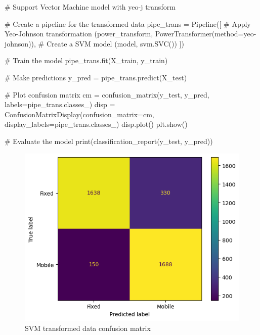 \documentclass[
  letterpaper,
  DIV=11,
  numbers=noendperiod,
  oneside]{scrartcl}
\newenvironment{Shaded}{\begin{snugshade}}{\end{snugshade}}
\newcommand{\BuiltInTok}[1]{\textcolor[rgb]{0.00,0.23,0.31}{#1}}
\newcommand{\CommentTok}[1]{\textcolor[rgb]{0.37,0.37,0.37}{#1}}
\newcommand{\NormalTok}[1]{\textcolor[rgb]{0.00,0.23,0.31}{#1}}
\newcommand{\OperatorTok}[1]{\textcolor[rgb]{0.37,0.37,0.37}{#1}}
\newcommand{\StringTok}[1]{\textcolor[rgb]{0.13,0.47,0.30}{#1}}
\begin{document}
\begin{Shaded}
\begin{Highlighting}[]
\CommentTok{\# Support Vector Machine model with yeo{-}j transform}

\CommentTok{\# Create a pipeline for the transformed data}
\NormalTok{pipe\_trans }\OperatorTok{=}\NormalTok{ Pipeline([}
    \CommentTok{\# Apply Yeo{-}Johnson transformation}
\NormalTok{    (}\StringTok{\textquotesingle{}power\_transform\textquotesingle{}}\NormalTok{, PowerTransformer(method}\OperatorTok{=}\StringTok{\textquotesingle{}yeo{-}johnson\textquotesingle{}}\NormalTok{)), }
    \CommentTok{\# Create a SVM model}
\NormalTok{    (}\StringTok{\textquotesingle{}model\textquotesingle{}}\NormalTok{, svm.SVC())  }
\NormalTok{])}

\CommentTok{\# Train the model}
\NormalTok{pipe\_trans.fit(X\_train, y\_train)}

\CommentTok{\# Make predictions}
\NormalTok{y\_pred }\OperatorTok{=}\NormalTok{ pipe\_trans.predict(X\_test)}

\CommentTok{\# Plot confusion matrix}
\NormalTok{cm }\OperatorTok{=}\NormalTok{ confusion\_matrix(y\_test, y\_pred, labels}\OperatorTok{=}\NormalTok{pipe\_trans.classes\_)}
\NormalTok{disp }\OperatorTok{=}\NormalTok{ ConfusionMatrixDisplay(confusion\_matrix}\OperatorTok{=}\NormalTok{cm, display\_labels}\OperatorTok{=}\NormalTok{pipe\_trans.classes\_)}
\NormalTok{disp.plot()}
\NormalTok{plt.show()}

\CommentTok{\# Evaluate the model}
\BuiltInTok{print}\NormalTok{(classification\_report(y\_test, y\_pred))}
\end{Highlighting}
\end{Shaded}

\begin{figure}[H]

{\centering \includegraphics{data-analytics_files/figure-latex/fig-transvector-output-1.png}

}

\caption{\label{fig-transvector}SVM transformed data confusion matrix}

\end{figure}
\end{document}
